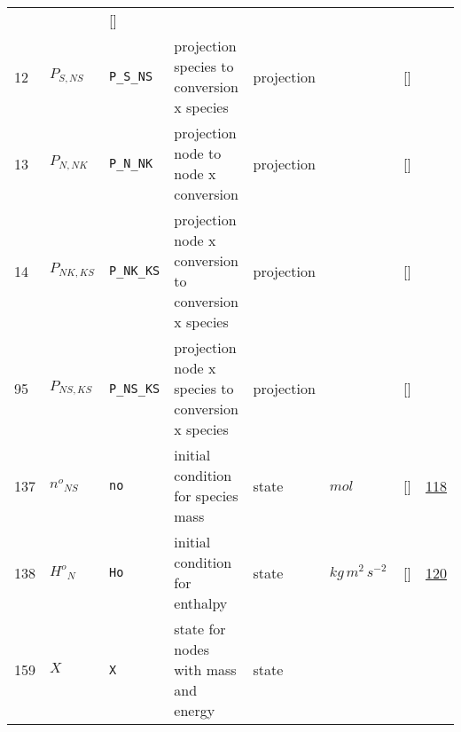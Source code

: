 \begin{longtable}{|p{1cm}|p{3cm}|p{3cm}|p{7cm}|p{3.0cm}|p{3cm}|p{2cm}|p{1cm}|}
             & $  $
             & []
             & \\
    12
             & \hypertarget{"v:12"}{ $ {P}_{S, {N S}} $}
             & \verb|P_S_NS|
             & projection species to conversion x
species
             & \begin{lay}projection \end{lay}
             & $  $
             & []
             & \\
    13
             & \hypertarget{"v:13"}{ $ {P}_{N, {N K}} $}
             & \verb|P_N_NK|
             & projection node to node x conversion
             & \begin{lay}projection \end{lay}
             & $  $
             & []
             & \\
    14
             & \hypertarget{"v:14"}{ $ {P}_{{N K}, {K S}} $}
             & \verb|P_NK_KS|
             & projection node x conversion to conversion x
species
             & \begin{lay}projection \end{lay}
             & $  $
             & []
             & \\
    95
             & \hypertarget{"v:95"}{ $ {P}_{{N S}, {K S}} $}
             & \verb|P_NS_KS|
             & projection node x species to conversion x
species
             & \begin{lay}projection \end{lay}
             & $  $
             & []
             & \\
    137
             & \hypertarget{"v:137"}{ $ {n^{o}}_{{N S}} $}
             & \verb|no|
             & initial condition for species mass
             & \begin{lay}state \end{lay}
             & $ mol \, $
             & []
             & \hyperlink{"e:118"}{ 118 }
                 \\
    138
             & \hypertarget{"v:138"}{ $ {H^{o}}_{N} $}
             & \verb|Ho|
             & initial condition for enthalpy
             & \begin{lay}state \end{lay}
             & $ kg \,m^{2} \,s^{-2} \, $
             & []
             & \hyperlink{"e:120"}{ 120 }
                 \\
    159
             & \hypertarget{"v:159"}{ $ {X}_{} $}
             & \verb|X|
             & state for nodes with mass and energy
             & \begin{lay}state \end{lay}

\end{longtable}
